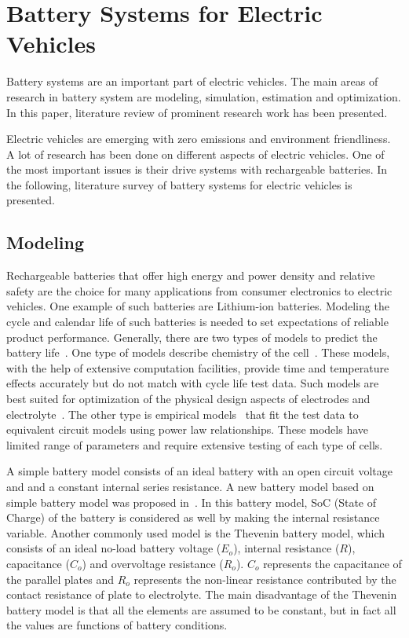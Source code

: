 \section{Battery Systems for Electric Vehicles} \label{sec:battery}

Battery systems are an important part of electric vehicles.  The main areas of research in battery system are modeling, simulation, estimation and optimization. In this paper, literature review of prominent research work has been presented.

Electric vehicles are emerging with zero emissions and environment friendliness. A lot of research has been done on different aspects of electric vehicles. One of the most important issues is their drive systems with rechargeable batteries. In the following, literature survey of battery systems for electric vehicles is presented. 

\subsection{Modeling}

Rechargeable batteries that offer high energy and
power density and relative safety are the choice for many applications from consumer
electronics to electric vehicles. One example of such batteries are Lithium-ion batteries. Modeling the cycle and
calendar life of such batteries is needed to set
expectations of reliable product performance. Generally, there are two types of models to predict the battery life~\cite{ZS_millner}. One type of models describe chemistry of the cell~\cite{ZS_Ning}. These models, with the help of extensive computation facilities, provide time and temperature effects accurately but do not match with cycle life test data. Such models are best suited for
optimization of the physical design aspects of electrodes
and electrolyte~\cite{ZS_den}. The other type is empirical models~\cite{ZS_dubarry} that fit the test data to equivalent circuit models using power law relationships. These models have limited range of parameters and require extensive testing of each type of cells. 

A simple battery model consists of an ideal battery with an open circuit voltage and and a constant internal series resistance. A new battery model based on simple battery model was proposed in~\cite{ZS_jean}. In this battery model, SoC (State of Charge) of the battery is considered as well by making the internal resistance variable. Another commonly used model is the Thevenin battery
model, which consists of an ideal no-load battery voltage ($E_o$),
internal resistance ($R$), capacitance ($C_o$) and overvoltage
resistance ($R_o$). $C_o$ represents the capacitance of the parallel
plates and $R_o$ represents the non-linear resistance contributed
by the contact resistance of plate to electrolyte. The main disadvantage of the Thevenin battery model is that
all the elements are assumed to be constant, but in fact all the
values are functions of battery conditions.


